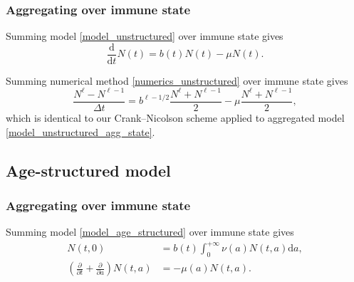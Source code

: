 \documentclass[USenglish]{article}
\newcommand{\md}{\mathrm{d}}
\begin{document}
\subsubsection{Aggregating over immune state}

Summing model \eqref{model_unstructured} over immune state gives
\begin{equation}
  \label{model_unstructured_agg_state}
  \frac{\md}{\md t} N(t)
  = b(t) N(t) - \mu N(t).
\end{equation}

Summing numerical method \eqref{numerics_unstructured} over
immune state gives
\begin{equation}
  \label{numerics_unstructured_agg_state}
  \frac{N^{\ell} - N^{\ell - 1}}{\Delta t}
  = b^{\ell - 1 / 2} \frac{N^{\ell} + N^{\ell - 1}}{2}
  - \mu \frac{N^{\ell} + N^{\ell - 1}}{2},
\end{equation}
which is identical to our Crank--Nicolson scheme applied to aggregated
model \eqref{model_unstructured_agg_state}.


\subsection{Age-structured model}


\subsubsection{Aggregating over immune state}

Summing model \eqref{model_age_structured} over immune state gives
\begin{subequations}
  \label{model_age_structured_agg_state}
  \begin{align}
    N(t, 0)
    &= b(t) \int_0^{+\infty} \nu(a) N(t, a) \md a,
    \\
    \left(\frac{\partial}{\partial t}
      + \frac{\partial}{\partial a}\right)
    N(t, a)
    &= - \mu(a) N(t, a).
  \end{align}
\end{subequations}
\end{document}
